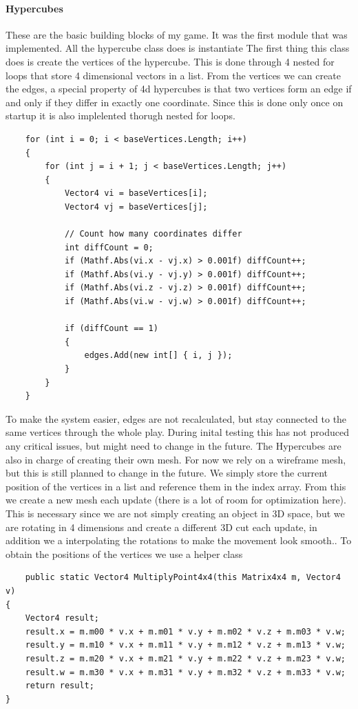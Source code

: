 \documentclass{article}
\begin{document}
\paragraph{Hypercubes}
These are the basic building blocks of my game. It was the first module that was implemented. All the hypercube class does is instantiate 
The first thing this class does is create the vertices of the hypercube. This is done through 4 nested for loops that store 4 dimensional vectors in a list. 
From the vertices we can create the edges, a special property of 4d hypercubes is that two vertices form an edge if and only if they differ in exactly one coordinate. Since this is done only once on startup it is also implelented thorugh nested for loops.
\begin{verbatim}
    for (int i = 0; i < baseVertices.Length; i++)
    {
        for (int j = i + 1; j < baseVertices.Length; j++)
        {
            Vector4 vi = baseVertices[i];
            Vector4 vj = baseVertices[j];

            // Count how many coordinates differ
            int diffCount = 0;
            if (Mathf.Abs(vi.x - vj.x) > 0.001f) diffCount++;
            if (Mathf.Abs(vi.y - vj.y) > 0.001f) diffCount++;
            if (Mathf.Abs(vi.z - vj.z) > 0.001f) diffCount++;
            if (Mathf.Abs(vi.w - vj.w) > 0.001f) diffCount++;

            if (diffCount == 1)
            {
                edges.Add(new int[] { i, j });
            }
        }
    }
\end{verbatim}
To make the system easier, edges are not recalculated, but stay connected to the same vertices through the whole play. During inital testing this has not produced any critical issues, but might need to change in the future.
The Hypercubes are also in charge of creating their own mesh. For now we rely on a wireframe mesh, but this is still planned to change in the future. We simply store the current position of the vertices in a list and reference them in the index array. From this we create a new mesh each update (there is a lot of room for optimization here). This is necessary since we are not simply creating an object in 3D space, but we are rotating in 4 dimensions and create a different 3D cut each update, in addition we a interpolating the rotations to make the movement look smooth..
To obtain the positions of the vertices we use a helper class 
\begin{verbatim}
    public static Vector4 MultiplyPoint4x4(this Matrix4x4 m, Vector4 v)
{
    Vector4 result;
    result.x = m.m00 * v.x + m.m01 * v.y + m.m02 * v.z + m.m03 * v.w;
    result.y = m.m10 * v.x + m.m11 * v.y + m.m12 * v.z + m.m13 * v.w;
    result.z = m.m20 * v.x + m.m21 * v.y + m.m22 * v.z + m.m23 * v.w;
    result.w = m.m30 * v.x + m.m31 * v.y + m.m32 * v.z + m.m33 * v.w;
    return result;
}
\end{verbatim}
\end{document}
